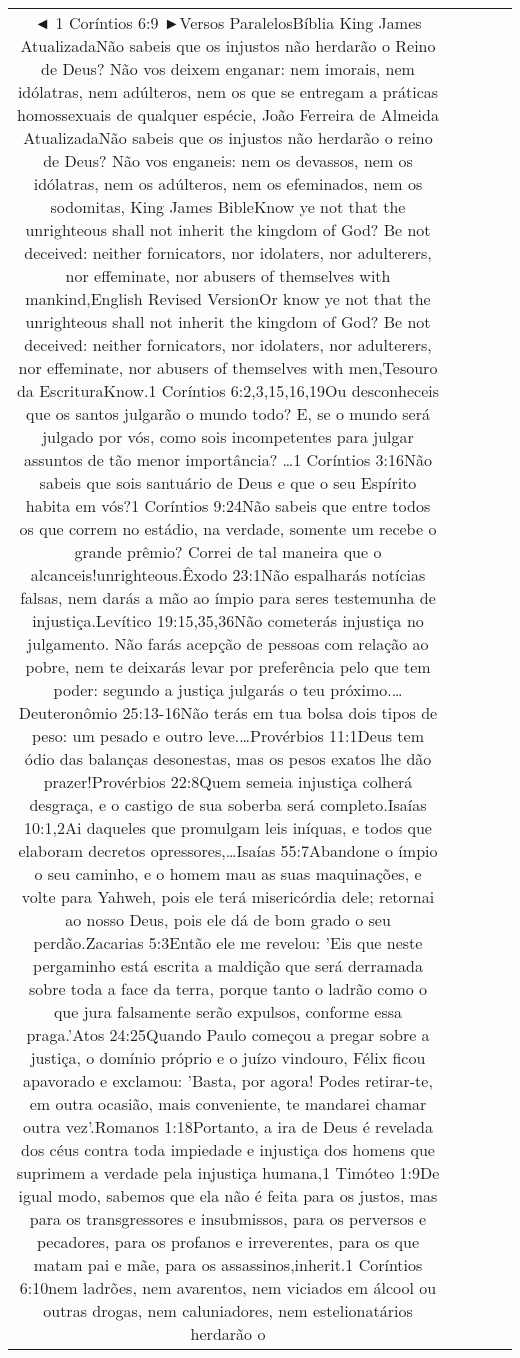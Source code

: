 \documentclass[11pt]{article}
\newlength\mylength
\begin{document}
\begin{center}
\begin{longtable}{|C{.65\mylength}|C{.30\mylength}|C{.12\mylength}|C{.12\mylength}|C{.12\mylength}|}
  \small ◄ 1 Coríntios 6:9 ►Versos ParalelosBíblia King James AtualizadaNão sabeis que os injustos não herdarão o Reino de Deus? Não vos deixem enganar: nem imorais, nem idólatras, nem adúlteros, nem os que se entregam a práticas homossexuais de qualquer espécie, João Ferreira de Almeida AtualizadaNão sabeis que os injustos não herdarão o reino de Deus? Não vos enganeis: nem os devassos, nem os idólatras, nem os adúlteros, nem os efeminados, nem os sodomitas,   King James BibleKnow ye not that the unrighteous shall not inherit the kingdom of God? Be not deceived: neither fornicators, nor idolaters, nor adulterers, nor effeminate, nor abusers of themselves with mankind,English Revised VersionOr know ye not that the unrighteous shall not inherit the kingdom of God? Be not deceived: neither fornicators, nor idolaters, nor adulterers, nor effeminate, nor abusers of themselves with men,Tesouro da EscrituraKnow.1 Coríntios 6:2,3,15,16,19Ou desconheceis que os santos julgarão o mundo todo? E, se o mundo será julgado por vós, como sois incompetentes para julgar assuntos de tão menor importância? …1 Coríntios 3:16Não sabeis que sois santuário de Deus e que o seu Espírito habita em vós?1 Coríntios 9:24Não sabeis que entre todos os que correm no estádio, na verdade, somente um recebe o grande prêmio? Correi de tal maneira que o alcanceis!unrighteous.Êxodo 23:1Não espalharás notícias falsas, nem darás a mão ao ímpio para seres testemunha de injustiça.Levítico 19:15,35,36Não cometerás injustiça no julgamento. Não farás acepção de pessoas com relação ao pobre, nem te deixarás levar por preferência pelo que tem poder: segundo a justiça julgarás o teu próximo.…Deuteronômio 25:13-16Não terás em tua bolsa dois tipos de peso: um pesado e outro leve.…Provérbios 11:1Deus tem ódio das balanças desonestas, mas os pesos exatos lhe dão prazer!Provérbios 22:8Quem semeia injustiça colherá desgraça, e o castigo de sua soberba será completo.Isaías 10:1,2Ai daqueles que promulgam leis iníquas, e todos que elaboram decretos opressores,…Isaías 55:7Abandone o ímpio o seu caminho, e o homem mau as suas maquinações, e volte para Yahweh, pois ele terá misericórdia dele; retornai ao nosso Deus, pois ele dá de bom grado o seu perdão.Zacarias 5:3Então ele me revelou: 'Eis que neste pergaminho está escrita a maldição que será derramada sobre toda a face da terra, porque tanto o ladrão como o que jura falsamente serão expulsos, conforme essa praga.'Atos 24:25Quando Paulo começou a pregar sobre a justiça, o domínio próprio e o juízo vindouro, Félix ficou apavorado e exclamou: 'Basta, por agora! Podes retirar-te, em outra ocasião, mais conveniente, te mandarei chamar outra vez'.Romanos 1:18Portanto, a ira de Deus é revelada dos céus contra toda impiedade e injustiça dos homens que suprimem a verdade pela injustiça humana,1 Timóteo 1:9De igual modo, sabemos que ela não é feita para os justos, mas para os transgressores e insubmissos, para os perversos e pecadores, para os profanos e irreverentes, para os que matam pai e mãe, para os assassinos,inherit.1 Coríntios 6:10nem ladrões, nem avarentos, nem viciados em álcool ou outras drogas, nem caluniadores, nem estelionatários herdarão o 
\end{longtable}
\end{center}
\end{document}
